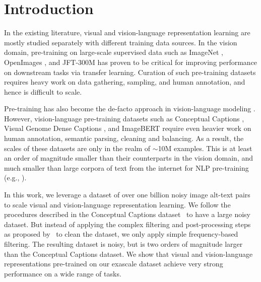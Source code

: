 \documentclass{article}
\begin{document}
\section{Introduction}
In the existing literature, visual %
and vision-language representation learning are mostly studied separately with different training data sources. In the vision domain, %
pre-training
on large-scale supervised data such as ImageNet \cite{deng:imagenet}, OpenImages \cite{kuznetsova:openimages}, and JFT-300M \cite{sun:jft, kolensnikov:bit} has proven to be critical for improving performance on downstream tasks via transfer learning. Curation of such pre-training datasets 
requires heavy work on data gathering, sampling, and human annotation, and hence is difficult to scale.

Pre-training has also become the de-facto approach in vision-language modeling \cite{lu:vilbert, chen:uniter, li:oscar}. However, vision-language pre-training datasets such as Conceptual Captions \cite{sharma:cc3m}, Visual Genome Dense Captions \cite{krishna:visualgenome}, 
and ImageBERT
\cite{qi:imagebert} require even heavier work on human annotation, semantic parsing, %
cleaning and balancing. As a result, the scales of these datasets are only in the realm of $\sim$10M examples. This is at least an order of magnitude smaller than their counterparts in the vision domain, and much smaller than large corpora of text from the internet for 
NLP
pre-training (e.g., \citet{devlin:bert, radford:gpt2, yang:xlnet, liu:roberta, raffel:t5}).

In this work, %
we leverage a dataset of over one billion noisy image alt-text pairs to scale visual and vision-language representation learning. 
We follow the procedures described in the Conceptual Captions dataset~\cite{sharma:cc3m} to have a large noisy dataset. But instead of applying the complex filtering and post-processing steps as proposed by~\cite{sharma:cc3m} to clean the dataset, we only apply simple frequency-based filtering. 
The resulting dataset is noisy, but is two orders of magnitude larger than the Conceptual Captions dataset. We show that visual and vision-language representations pre-trained on our exascale dataset achieve very strong performance on a wide range of tasks. 
\end{document}
